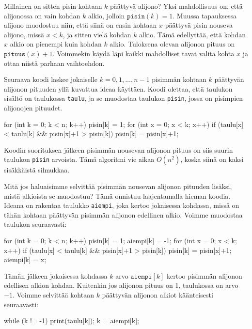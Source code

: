 Millainen on sitten pisin kohtaan $k$ päättyvä alijono?
Yksi mahdollisuus on, että alijonossa on vain kohdan $k$ alkio,
jolloin $\texttt{pisin}(k)=1$.
Muussa tapauksessa alijono muodostuu niin,
että siinä on ensin kohtaan $x$ päättyvä
pisin nouseva alijono, missä $x<k$, ja sitten vielä kohdan $k$ alkio.
Tämä edellyttää, että kohdan $x$ alkio on pienempi
kuin kohdan $k$ alkio.
Tuloksena olevan alijonon pituus on $\texttt{pituus}(x)+1$.
Voimmekin käydä läpi kaikki mahdolliset tavat valita kohta $x$
ja ottaa niistä parhaan vaihtoehdon.

Seuraava koodi laskee jokaiselle $k=0,1,\dots,n-1$
pisimmän kohtaan $k$ päättyvän alijonon pituuden yllä kuvattua
ideaa käyttäen.
Koodi olettaa, että taulukon sisältö on taulukossa \texttt{taulu},
ja se muodostaa taulukon \texttt{pisin}, jossa on pisimpien
alijonojen pituudet.

\begin{code}
for (int k = 0; k < n; k++) {
    pisin[k] = 1;
    for (int x = 0; x < k; x++) {
        if (taulu[x] < taulu[k] && pisin[x]+1 > pisin[k]) {
            pisin[k] = pisin[x]+1;
        }
    }
}
\end{code}

Koodin suorituksen jälkeen pisimmän nousevan alijonon pituus on
siis suurin taulukon \texttt{pisin} arvoista.
Tämä algoritmi vie aikaa $O(n^2)$, koska siinä on kaksi
sisäkkäistä silmukkaa.

Mitä jos haluaisimme selvittää pisimmän nousevan alijonon
pituuden lisäksi, mistä alkioista se muodostuu?
Tämä onnistuu laajentamalla hieman koodia.
Ideana on rakentaa taulukko \texttt{aiempi},
joka kertoo jokaisessa kohdassa, missä on tähän kohtaan
päättyvän pisimmän alijonon edellinen alkio.
Voimme muodostaa taulukon seuraavasti:

\begin{code}
for (int k = 0; k < n; k++) {
    pisin[k] = 1;
    aiempi[k] = -1;
    for (int x = 0; x < k; x++) {
        if (taulu[x] < taulu[k] && pisin[x]+1 > pisin[k]) {
            pisin[k] = pisin[x]+1;
            aiempi[k] = x;
        }
    }
}
\end{code}

Tämän jälkeen jokaisessa kohdassa $k$ arvo $\texttt{aiempi}[k]$
kertoo pisimmän alijonon edellisen alkion kohdan.
Kuitenkin jos alijonon pituus on 1, taulukossa on arvo $-1$.
Voimme selvittää kohtaan $k$ päättyvän alijonon alkiot
käänteisesti seuraavasti:

\begin{code}
while (k != -1) {
    print(taulu[k]);
    k = aiempi[k];
}
\end{code}

